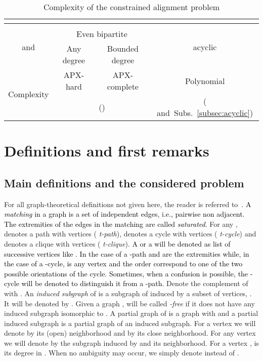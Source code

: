 \documentclass[final]{dmtcs-episciences}
\newcommand\mar[1]{\textcolor{black}{#1}}
\begin{document}
\begin{center}
\begin{table}[ht]
\centering
\footnotesize
\begin{tabular}{|c|c|c|c|}

\hline 
 &\multicolumn{3}{|c|}{}\\
\hline
 &\multicolumn{3}{|c|}{}\\

\hline
\multirow{2}{*}{ and }&\multicolumn{2}{|c|}{ 
Even bipartite}&\multirow{2}{*}{ acyclic}\\
\cline{2-3}
&Any degree & Bounded degree&\\
\hline
\hline
\multirow{2}{*}{Complexity}  &APX-hard&APX-complete&Polynomial\\
&\multicolumn{2}{|c|}{(\citet{Fertin200990})}&(\citet{AbakaBE13} and~Subs.~\ref{subsec:acyclic})\\
\hline
\end{tabular}
\caption{Complexity of the constrained alignment problem}
\label{table-complex}
\end{table}
\end{center}





\newpage
 

 \section{Definitions and first remarks}\label{sec:definitions}

\subsection{Main definitions and the considered problem}\label{sub:def}

For all graph-theoretical definitions not given here, the reader is referred to~\citet{golumbicbook}. \mar{A  \emph{ matching} in a graph is a set of independent edges, i.e., pairwise non adjacent. The extremities of the edges in the matching are called  \emph{ saturated}.}
For any ,  denotes a path with  vertices ( \emph{ t-path}),  denotes a  cycle with  vertices ( \emph{ t-cycle}) and  denotes a clique with  vertices ( \emph{ t-clique}). \mar{A  or a  will be denoted as list of successive vertices like . In the case of a -path  and  are the extremities while, in the case of a -cycle,  is any vertex and the order correspond to one of the two possible orientations of the cycle. Sometimes, when a confusion is possible, the -cycle will be denoted  to distinguish it from a -path.}
Denote the complement of  with . An  \emph{ induced subgraph} of  is a subgraph of  induced by a subset of vertices, . It will be denoted by . Given a graph ,  will be called {\em -free} if it does not have any induced subgraph isomorphic to . A partial graph of  is a graph  with  and a partial induced subgraph is a partial graph of an induced subgraph. For a vertex  we will denote by  its (open) neighborhood and by  its close neighborhood. For any vertex  we will denote by  the subgraph induced by  and its neighborhood. For a vertex ,  is its degree in . When no ambiguity may occur, we simply denote  instead of .
\end{document}
